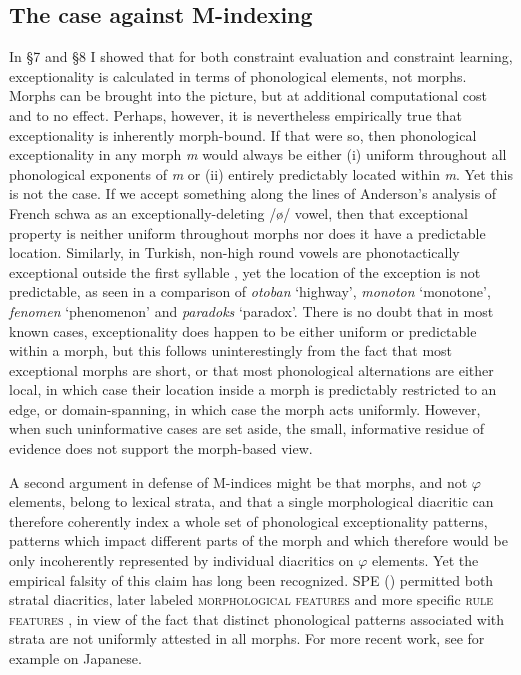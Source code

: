 \documentclass[output=paper,
modfonts
]{LSP/langsci}
\begin{document}
\subsection[The case against M{}-indexing]{The case against M-indexing}
\label{bkm:Ref336968525}
In §7 and §8 I showed that for both constraint evaluation and constraint learning, exceptionality is calculated in terms of phonological elements, not morphs. Morphs can be brought into the picture, but at additional computational cost and to no effect. Perhaps, however, it is nevertheless empirically true that exceptionality is inherently morph-bound. If that were so, then phonological exceptionality in any morph \textit{m} would always be either (i) uniform throughout all phonological exponents of \textit{m} or (ii) entirely predictably located within \textit{m}. Yet this is not the case. If we accept something along the lines of Anderson's \citeyearpar{anderson1982} analysis of French schwa as an exceptionally-deleting /ø/ vowel, then that exceptional property is neither uniform throughout morphs nor does it have a predictable location. Similarly, in Turkish, non-high round vowels are phonotactically exceptional outside the first syllable \citep{clements1982r,Van1991}, yet the location of the exception is not predictable, as seen in a comparison of \textit{otoban} `highway', \textit{monoton} `monotone', \textit{fenomen} `phenomenon' and \textit{paradoks} `paradox'. There is no doubt that in most known cases, exceptionality does happen to be either uniform or predictable within a morph, but this follows uninterestingly from the fact that most exceptional morphs are short, or that most phonological alternations are either local, in which case their location inside a morph is predictably restricted to an edge, or domain-spanning, in which case the morph acts uniformly. However, when such uninformative cases are set aside, the small, informative residue of evidence does not support the morph-based view.

A second argument in defense of M-indices might be that morphs, and not $\varphi $ elements, belong to lexical strata, and that a single morphological diacritic can therefore coherently index a whole set of phonological exceptionality patterns, patterns which impact different parts of the morph and which therefore would be only incoherently represented by individual diacritics on $\varphi $ elements. Yet the empirical falsity of this claim has long been recognized. SPE (\citealt{chomskyhalle1968}) permitted both stratal diacritics, later labeled \textsc{morphological features} \citep{postal1968} and more specific \textsc{rule features} \citep{lakoff1970}, in view of the fact that distinct phonological patterns associated with strata are not uniformly attested in all morphs. For more recent work, see for example \citet[71,72,85ff]{labrune2012} on Japanese.
\end{document}
